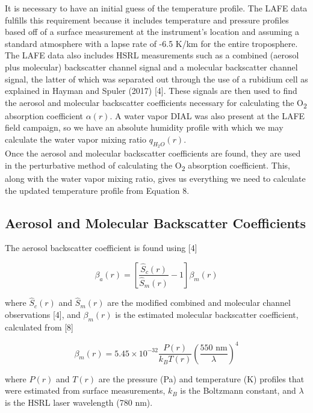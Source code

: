 \documentclass[twoside]{article}
\begin{document}
It is necessary to have an initial guess of the temperature profile.
The LAFE data fulfills this requirement because it includes temperature and pressure profiles based off of a surface measurement at the instrument's location and assuming a standard atmosphere with a lapse rate of -6.5 K/km for the entire troposphere.
The LAFE data also includes HSRL measurements such as a combined (aerosol plus molecular) backscatter channel signal and a molecular backscatter channel signal, the latter of which was separated out through the use of a rubidium cell as explained in Hayman and Spuler (2017) [4].
These signals are then used to find the aerosol and molecular backscatter coefficients necessary for calculating the O\textsubscript{2} absorption coefficient $\alpha(r)$. 
A water vapor DIAL was also present at the LAFE field campaign, so we have an absolute humidity profile with which we may calculate the water vapor mixing ratio $q_{H_2O}(r)$.\\
\noindent Once the aerosol and molecular backscatter coefficients are found, they are used in the perturbative method of calculating the O\textsubscript{2} absorption coefficient.
This, along with the water vapor mixing ratio, gives us everything we need to calculate the updated temperature profile from Equation 8.

\subsection{Aerosol and Molecular Backscatter Coefficients}
The aerosol backscatter coefficient is found using [4]

\begin{equation}
	\beta_a(r) = \left[ \frac{\hat{S}_c(r)}{\hat{S}_m(r)}-1 \right] \beta_m(r)
\end{equation}

\noindent where $\hat{S}_c(r)$ and $\hat{S}_m(r)$ are the modified combined and molecular channel observations [4], and $\beta_m(r)$ is the estimated molecular backscatter coefficient, calculated from [8]

\begin{equation}
	\beta_m(r) = 5.45 \times 10^{-32} \frac{P(r)}{k_B T(r)} \left( \frac{550 \text{ nm}}{\lambda} \right) ^4
\end{equation}

\noindent where $P(r)$ and $T(r)$ are the pressure (Pa) and temperature (K) profiles that were estimated from surface measurements, $k_B$ is the Boltzmann constant, and $\lambda$ is the HSRL laser wavelength (780 nm).
\end{document}
